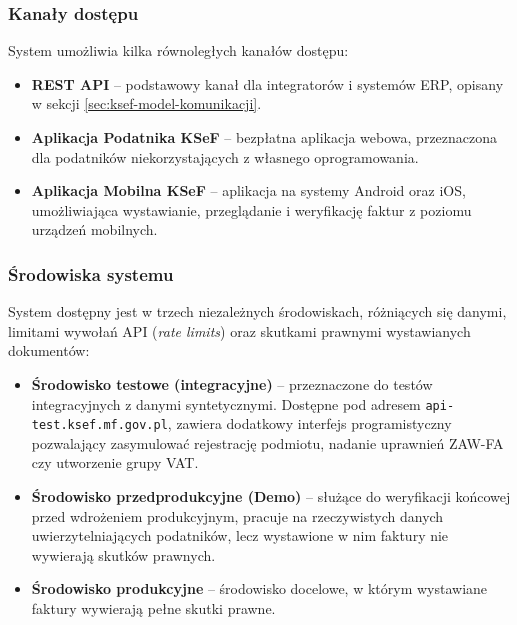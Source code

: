 \subsubsection{Kanały dostępu}
\label{sec:ksef-kanaly-dostepu}

System umożliwia kilka równoległych kanałów dostępu: \cite{ksef-plan-wdrozenia}

\begin{itemize}
    \item \textbf{REST API} -- podstawowy kanał dla integratorów i systemów ERP, opisany w sekcji \ref{sec:ksef-model-komunikacji}.
    \item \textbf{Aplikacja Podatnika KSeF} -- bezpłatna aplikacja webowa, przeznaczona dla podatników niekorzystających z własnego oprogramowania.
    \item \textbf{Aplikacja Mobilna KSeF} -- aplikacja na systemy Android oraz iOS, umożliwiająca wystawianie, przeglądanie i weryfikację faktur z poziomu urządzeń mobilnych.
\end{itemize}

\subsubsection{Środowiska systemu}
\label{sec:ksef-srodowiska}

System dostępny jest w trzech niezależnych środowiskach, różniących się danymi, limitami wywołań API (\textit{rate limits}) oraz skutkami prawnymi wystawianych dokumentów:

\begin{itemize}
    \item \textbf{Środowisko testowe (integracyjne)} -- przeznaczone do testów integracyjnych z danymi syntetycznymi. Dostępne pod adresem \texttt{api-test.ksef.mf.gov.pl}, zawiera dodatkowy interfejs programistyczny pozwalający zasymulować rejestrację podmiotu, nadanie uprawnień ZAW-FA czy utworzenie grupy VAT. \cite{ksef-docs-przeglad,ksef-start-testow}
    \item \textbf{Środowisko przedprodukcyjne (Demo)} -- służące do weryfikacji końcowej przed wdrożeniem produkcyjnym, pracuje na rzeczywistych danych uwierzytelniających podatników, lecz wystawione w nim faktury nie wywierają skutków prawnych. \cite{ksef-udostepnienie-przedprod}
    \item \textbf{Środowisko produkcyjne} -- środowisko docelowe, w którym wystawiane faktury wywierają pełne skutki prawne. \cite{ksef-udostepnienie-prod}
\end{itemize}


